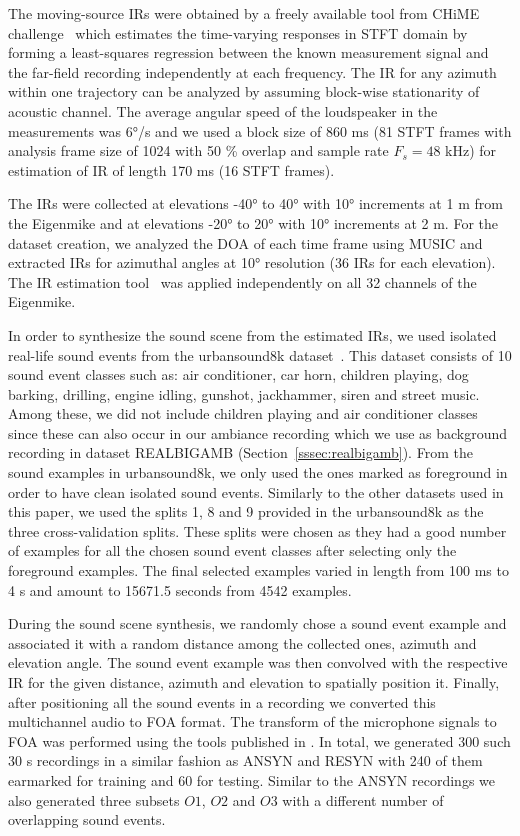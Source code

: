 \documentclass[journal]{IEEEtran}
\begin{document}
The moving-source IRs were obtained by a freely available tool from CHiME challenge~\cite{chime} which estimates the time-varying responses in STFT domain by forming a least-squares regression between the known measurement signal and the far-field recording independently at each frequency. The IR for any azimuth within one trajectory can be analyzed by assuming block-wise stationarity of acoustic channel. The average angular speed of the loudspeaker in the measurements was \ang{6}/s and we used a block size of 860 ms (81 STFT frames with analysis frame size of 1024 with 50 \% overlap and sample rate $F_s = 48$ kHz) for estimation of IR of length 170 ms (16 STFT frames).


The IRs were collected at elevations \ang{-40} to \ang{40} with \ang{10} increments at 1 m from the Eigenmike and at elevations \ang{-20} to \ang{20} with \ang{10} increments at 2 m. For the dataset creation, we analyzed the DOA of each time frame using MUSIC and extracted IRs for azimuthal angles at \ang{10} resolution (36 IRs for each elevation). The IR estimation tool~\cite{chime} was applied independently on all 32 channels of the Eigenmike. 

In order to synthesize the sound scene from the estimated IRs, we used isolated real-life sound events from the urbansound8k dataset~\cite{Salamon2014_acm}. This dataset consists of 10 sound event classes such as: air conditioner, car horn, children playing, dog barking, drilling, engine idling, gunshot, jackhammer, siren and street music. Among these, we did not include children playing and air conditioner classes since these can also occur in our ambiance recording which we use as background recording in dataset REALBIGAMB (Section~\ref{sssec:realbigamb}). From the sound examples in urbansound8k, we only used the ones marked as foreground in order to have clean isolated sound events. Similarly to the other datasets used in this paper, we used the splits 1, 8 and 9 provided in the urbansound8k as the three cross-validation splits. These splits were chosen as they had a good number of examples for all the chosen sound event classes after selecting only the foreground examples. The final selected examples varied in length from 100 ms to 4 s and amount to 15671.5 seconds from 4542 examples. 

During the sound scene synthesis, we randomly chose a sound event example and associated it with a random distance among the collected ones, azimuth and elevation angle. The sound event example was then convolved with the respective IR for the given distance, azimuth and elevation to spatially position it. Finally, after positioning all the sound events in a recording we converted this multichannel audio to FOA format. The transform of the microphone signals to FOA was performed using the tools published in \cite{politis_phd2016}. In total, we generated 300 such 30 s recordings in a similar fashion as ANSYN and RESYN with 240 of them earmarked for training and 60 for testing. Similar to the ANSYN recordings we also generated three subsets $O1$, $O2$ and $O3$ with a different number of overlapping sound events.
\end{document}
